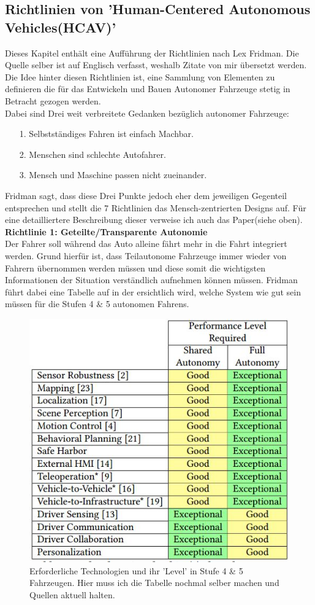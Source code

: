 

\subsection{Richtlinien von 'Human-Centered Autonomous Vehicles(HCAV)' \cite{b5} }
Dieses Kapitel enthält eine Aufführung der Richtlinien nach Lex Fridman\cite{b6}. Die Quelle selber ist auf Englisch verfasst, weshalb Zitate von mir übersetzt werden. Die Idee hinter diesen Richtlinien ist, eine Sammlung von Elementen zu definieren die für das Entwickeln und Bauen Autonomer Fahrzeuge stetig in Betracht gezogen werden.\\
Dabei sind Drei weit verbreitete Gedanken bezüglich autonomer Fahrzeuge:
\begin{itemize}
	\item[1. ]Selbstständiges Fahren ist einfach Machbar.\cite{b7,b8,b9}
	\item[2. ]Menschen sind schlechte Autofahrer.\cite{b10,b11}
	\item[3. ]Mensch und Maschine passen nicht zueinander.\cite{b12,b13}
\end{itemize}
Fridman sagt, dass diese Drei Punkte jedoch eher dem jeweiligen Gegenteil entsprechen und stellt die 7 Richtlinien das Mensch-zentrierten Designs auf. Für eine detailliertere Beschreibung dieser verweise ich auch das Paper(siehe oben).\\

\textbf{Richtlinie 1: Geteilte/Transparente Autonomie}\\
Der Fahrer soll während das Auto alleine fährt mehr in die Fahrt integriert werden. Grund hierfür ist, dass Teilautonome Fahrzeuge immer wieder von Fahrern übernommen werden müssen und diese somit die wichtigsten Informationen der Situation verständlich aufnehmen können müssen. Fridman führt dabei eine Tabelle auf in der ersichtlich wird, welche System wie gut sein müssen für die Stufen 4 \& 5 autonomen Fahrens. \cite{b14}
\begin{figure}[!h]
	\centering
	\includegraphics[width=0.45\columnwidth]{pictures/reqTableLexFridman.jpg}
	\caption{Erforderliche Technologien und ihr 'Level' in Stufe 4 \& 5 Fahrzeugen.
		Hier muss ich die Tabelle nochmal selber machen und Quellen aktuell halten.}
	\label{img:fridman1}
\end{figure}

